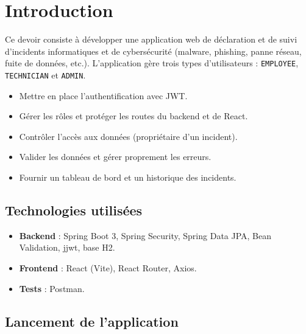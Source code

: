 \documentclass{rapportENSET}
\begin{document}

\fairemarges
\fairepagedegarde
\tabledematieres
\newpage

\section{Introduction}

Ce devoir consiste \`a d\'evelopper une application web de d\'eclaration et de suivi d'incidents informatiques et de cybers\'ecurit\'e (malware, phishing, panne r\'eseau, fuite de donn\'ees, etc.). L'application g\`ere trois types d'utilisateurs : \texttt{EMPLOYEE}, \texttt{TECHNICIAN} et \texttt{ADMIN}.

\begin{objectifbox}
\begin{itemize}
  \item Mettre en place l'authentification avec JWT.
  \item G\'erer les r\^oles et prot\'eger les routes du backend et de React.
  \item Contr\^oler l'acc\`es aux donn\'ees (propri\'etaire d'un incident).
  \item Valider les donn\'ees et g\'erer proprement les erreurs.
  \item Fournir un tableau de bord et un historique des incidents.
\end{itemize}
\end{objectifbox}

\subsection{Technologies utilis\'ees}

\begin{itemize}
  \item \textbf{Backend} : Spring Boot 3, Spring Security, Spring Data JPA, Bean Validation, jjwt, base H2.
  \item \textbf{Frontend} : React (Vite), React Router, Axios.
  \item \textbf{Tests} : Postman.
\end{itemize}

\subsection{Lancement de l'application}
\end{document}
